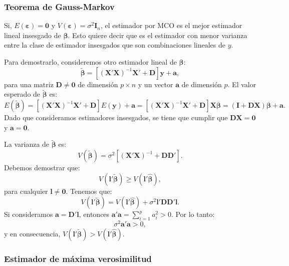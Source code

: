 \documentclass[
]{article}
\begin{document}
\subsubsection{Teorema de Gauss-Markov}\label{teorema-de-gauss-markov}

Si, \(E(\boldsymbol \varepsilon) = \boldsymbol 0\) y \(V(\boldsymbol \varepsilon) = \sigma^{2}\boldsymbol I_{n}\), el estimador por MCO es el mejor estimador lineal insesgado de \(\boldsymbol \beta\). Esto quiere decir que es el estimador con menor varianza entre la clase de estimador insesgados que son combinaciones lineales de \(y\).

Para demostrarlo, consideremos otro estimador lineal de \(\boldsymbol \beta\):
\[
\tilde{\boldsymbol \beta}= [ (\boldsymbol X'\boldsymbol X)^{-1}\boldsymbol X' + \boldsymbol D]\boldsymbol y+ \boldsymbol a,
\]
para una matriz \(\boldsymbol D\neq \boldsymbol 0\) de dimensión \(p\times n\) y un vector \(\boldsymbol a\) de dimensión \(p\). El valor esperado de \(\tilde{\boldsymbol \beta}\) es:
\[
E(\tilde{\boldsymbol \beta}) = [ (\boldsymbol X'\boldsymbol X)^{-1}\boldsymbol X' + \boldsymbol D]E(\boldsymbol y) + \boldsymbol a=[ (\boldsymbol X'\boldsymbol X)^{-1}\boldsymbol X' + \boldsymbol D]\boldsymbol X\boldsymbol \beta= (\boldsymbol I+ \boldsymbol D\boldsymbol X)\boldsymbol \beta+ \boldsymbol a.
\]
Dado que consideramos estimadores insesgados, se tiene que cumplir que \(\boldsymbol D\boldsymbol X= \boldsymbol 0\) y \(\boldsymbol a= \boldsymbol 0\).

La varianza de \(\tilde{\boldsymbol \beta}\) es:
\[
V(\tilde{\boldsymbol \beta}) = \sigma^{2}\left[ (\boldsymbol X'\boldsymbol X)^{-1} + \boldsymbol D\boldsymbol D'\right].
\]
Debemos demostrar que:
\[
V(\boldsymbol l'\tilde{\boldsymbol \beta}) \geq V(\boldsymbol l'\widehat{\boldsymbol \beta}),
\]
para cualquier \(\boldsymbol l\neq \boldsymbol 0\). Tenemos que:
\[
V(\boldsymbol l'\tilde{\boldsymbol \beta}) = V(\boldsymbol l'\widehat{\boldsymbol \beta}) + \sigma^{2}\boldsymbol l'\boldsymbol D\boldsymbol D'\boldsymbol l.
\]
Si consideramos \(\boldsymbol a= \boldsymbol D'\boldsymbol l\), entonces \(\boldsymbol a'\boldsymbol a= \sum_{i=1}^{p}a^{2}_i > 0\). Por lo tanto:
\[
\sigma^{2}\boldsymbol a'\boldsymbol a> 0,
\]
y en consecuencia, \(V(\boldsymbol l'\tilde{\boldsymbol \beta}) > V(\boldsymbol l'\widehat{\boldsymbol \beta})\).

\subsubsection{Estimador de máxima verosimilitud}\label{estimador-de-muxe1xima-verosimilitud}
\end{document}
